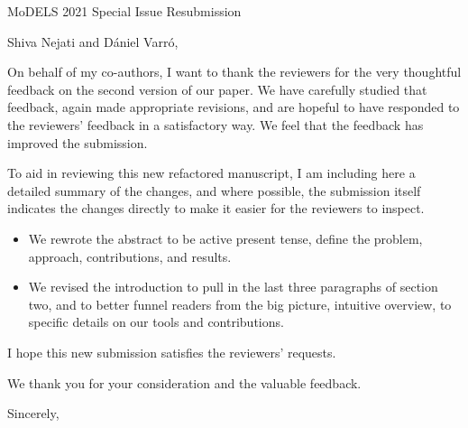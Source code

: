 \documentclass[10pt]{byu-cs}
\begin{document}
\pagestyle{headings}

\signature{Eric G Mercer\\
           Associate Professor}

\begin{letter}{MoDELS 2021 Special Issue Resubmission}

\date{\today}

\opening{Shiva Nejati and D\'{a}niel Varr\'{o},}

On behalf of my co-authors, I want to thank the reviewers for the very thoughtful feedback on the second version of our paper.
We have carefully studied that feedback, again made appropriate revisions, and are hopeful to have responded to the reviewers' feedback in a satisfactory way.
We feel that the feedback has improved the submission.

To aid in reviewing this new refactored manuscript, I am including here a detailed summary of the changes, and where possible, the submission itself indicates the changes directly to make it easier for the reviewers to inspect.
\begin{itemize}
  \item We rewrote the abstract to be active present tense, define the problem, approach, contributions, and results.
  \item We revised the introduction to pull in the last three paragraphs of section two, and to better funnel readers from the big picture, intuitive overview, to specific details on our tools and contributions. 
\end{itemize}

I hope this new submission satisfies the reviewers' requests.

We thank you for your consideration and the valuable feedback.

\closing{Sincerely,}

\end{letter}
\end{document}
